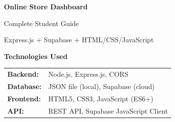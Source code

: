 \documentclass[12pt,a4paper]{article}
\begin{document}
\begin{titlepage}
    \centering
    \vspace*{2cm}
    
    {\Huge\bfseries Online Store Dashboard\par}
    \vspace{1cm}
    {\Large Complete Student Guide\par}
    \vspace{0.5cm}
    {\large Express.js + Supabase + HTML/CSS/JavaScript\par}
    
    \vspace{2cm}
    
    \begin{center}
    \end{center}
    
    \vspace{2cm}
    {\large\textbf{Technologies Used}\par}
    \vspace{0.5cm}
    \begin{tabular}{ll}
        \textbf{Backend:} & Node.js, Express.js, CORS \\
        \textbf{Database:} & JSON file (local), Supabase (cloud) \\
        \textbf{Frontend:} & HTML5, CSS3, JavaScript (ES6+) \\
        \textbf{API:} & REST API, Supabase JavaScript Client \\
    \end{tabular}
    
    \vfill
    {\large\date{\today}\par}
\end{titlepage}
\end{document}
